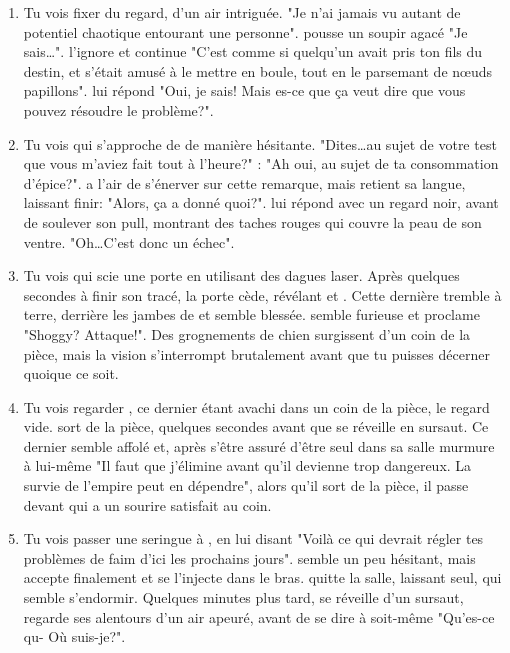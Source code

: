 {\begin{enumerate}
		\item Tu vois \nmPlayerIX fixer \nmPlayerXI du regard, d'un air intriguée. "Je n'ai jamais vu autant de potentiel chaotique entourant une personne". \nmPlayerXI pousse un soupir agacé "Je sais\dots". \nmPlayerIX l'ignore et continue "C'est comme si quelqu'un avait pris ton fils du destin, et s'était amusé à le mettre en boule, tout en le parsemant de nœuds papillons". \nmPlayerXI lui répond "Oui, je sais! Mais es-ce que ça veut dire que vous pouvez résoudre le problème?".
		
		\item Tu vois \nmPlayerIII qui s'approche de \nmPlayerXII de manière hésitante. "Dites\dots au sujet de votre test que vous m'aviez fait tout à l'heure?" \nmPlayerXII: "Ah oui, au sujet de ta consommation d'épice?". \nmPlayerIII a l'air de s'énerver sur cette remarque, mais retient sa langue, laissant \nmPlayerXII finir: "Alors, ça a donné quoi?". \nmPlayerIII lui répond avec un regard noir, avant de soulever son pull, montrant des taches rouges qui couvre la peau de son ventre. "Oh\dots C'est donc un échec".
		
		
		\item Tu vois \nmPlayerX qui scie une porte en utilisant des dagues laser. Après quelques secondes à finir son tracé, la porte cède, révélant \nmPlayerVI et \nmPlayerIX. Cette dernière tremble à terre, derrière les jambes de \nmPlayerVI et semble blessée. \nmPlayerVI semble furieuse et proclame "Shoggy? Attaque!". Des grognements de chien surgissent d'un coin de la pièce, mais la vision s'interrompt brutalement avant que tu puisses décerner quoique ce soit.
		
		\item Tu vois \nmPlayerIX regarder \nmPlayerVIII, ce dernier étant avachi dans un coin de la pièce, le regard vide. \nmPlayerIX sort de la pièce, quelques secondes avant que \nmPlayerVIII se réveille en sursaut. Ce dernier semble affolé et, après s'être assuré d'être seul dans sa salle murmure à lui-même "Il faut que j'élimine \nmPlayerX avant qu'il devienne trop dangereux. La survie de l'empire peut en dépendre", alors qu'il sort de la pièce, il passe devant \nmPlayerIX qui a un sourire satisfait au coin.
		
		\item Tu vois \nmPlayerI passer une seringue à \nmPlayerIII, en lui disant "Voilà ce qui devrait régler tes problèmes de faim d'ici les prochains jours". \nmPlayerIII semble un peu hésitant, mais accepte finalement et se l'injecte dans le bras. \nmPlayerI quitte la salle, laissant \nmPlayerIII seul, qui semble s'endormir. Quelques minutes plus tard, \nmPlayerIII se réveille d'un sursaut, regarde ses alentours d'un air apeuré, avant de se dire à soit-même "Qu'es-ce qu- Où suis-je?".
		

\end{enumerate}}
